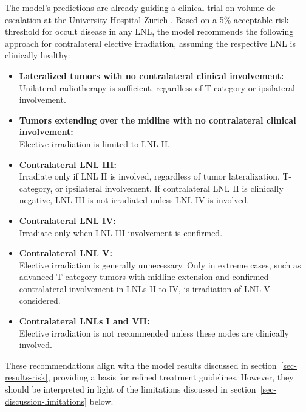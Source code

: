 \documentclass[
  sn-mathphys-num,
]{sn-jnl}
\providecommand{\tightlist}{%
  \setlength{\itemsep}{0pt}\setlength{\parskip}{0pt}}\usepackage{longtable,booktabs,array}
\begin{document}
The model's predictions are already guiding a clinical trial on volume
de-escalation at the University Hospital Zurich
\citep{universityofzurich_personalized_2024}. Based on a 5\% acceptable
risk threshold for occult disease in any LNL, the model recommends the
following approach for contralateral elective irradiation, assuming the
respective LNL is clinically healthy:

\begin{itemize}
\tightlist
\item
  \textbf{Lateralized tumors with no contralateral clinical
  involvement:}\\
  Unilateral radiotherapy is sufficient, regardless of T-category or
  ipsilateral involvement.\\
\item
  \textbf{Tumors extending over the midline with no contralateral
  clinical involvement:}\\
  Elective irradiation is limited to LNL II.\\
\item
  \textbf{Contralateral LNL III:}\\
  Irradiate only if LNL II is involved, regardless of tumor
  lateralization, T-category, or ipsilateral involvement. If
  contralateral LNL II is clinically negative, LNL III is not irradiated
  unless LNL IV is involved.\\
\item
  \textbf{Contralateral LNL IV:}\\
  Irradiate only when LNL III involvement is confirmed.\\
\item
  \textbf{Contralateral LNL V:}\\
  Elective irradiation is generally unnecessary. Only in extreme cases,
  such as advanced T-category tumors with midline extension and
  confirmed contralateral involvement in LNLs II to IV, is irradiation
  of LNL V considered.\\
\item
  \textbf{Contralateral LNLs I and VII:}\\
  Elective irradiation is not recommended unless these nodes are
  clinically involved.
\end{itemize}

These recommendations align with the model results discussed in
section~\ref{sec-results-risk}, providing a basis for refined treatment
guidelines. However, they should be interpreted in light of the
limitations discussed in section~\ref{sec-discussion-limitations} below.
\end{document}
